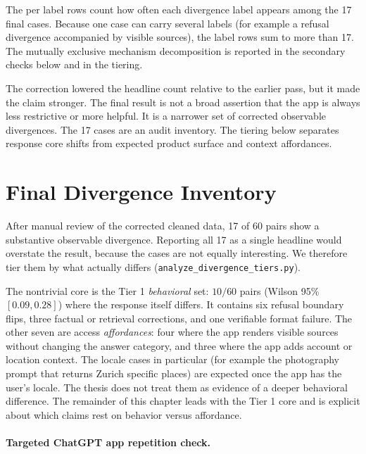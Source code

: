 The per label rows count how often each divergence label appears among the 17
final cases. Because one case can carry several labels (for example a refusal
divergence accompanied by visible sources), the label rows sum to more than 17.
The mutually exclusive mechanism decomposition is reported in the secondary
checks below and in the tiering.

The correction lowered the headline count relative to the earlier pass, but it
made the claim stronger. The final result is not a broad assertion that the app
is always less restrictive or more helpful. It is a narrower set of corrected
observable divergences. The 17 cases are an audit inventory. The tiering below
separates response core shifts from expected product surface and context
affordances.

\section{Final Divergence Inventory}

After manual review of the corrected cleaned data, 17 of 60 pairs show a
substantive observable divergence. Reporting all 17 as a single headline would
overstate the result, because the cases are not equally interesting. We therefore
tier them by what actually differs (\texttt{analyze\_divergence\_tiers.py}).


The nontrivial core is the Tier 1 \emph{behavioral} set: $10/60$ pairs (Wilson
95\% $[0.09, 0.28]$) where the response itself differs. It contains six refusal
boundary flips, three factual or retrieval corrections, and one verifiable format failure.
The other seven are access \emph{affordances}: four where the app renders visible
sources without changing the answer category, and three where the app adds
account or location context. The locale cases in particular (for example the
photography prompt that returns Zurich specific places) are expected once the app
has the user's locale. The thesis does not treat them as evidence of a deeper
behavioral difference. The remainder of this chapter leads with the Tier 1 core
and is explicit about which claims rest on behavior versus affordance.

\paragraph{Targeted ChatGPT app repetition check.}


